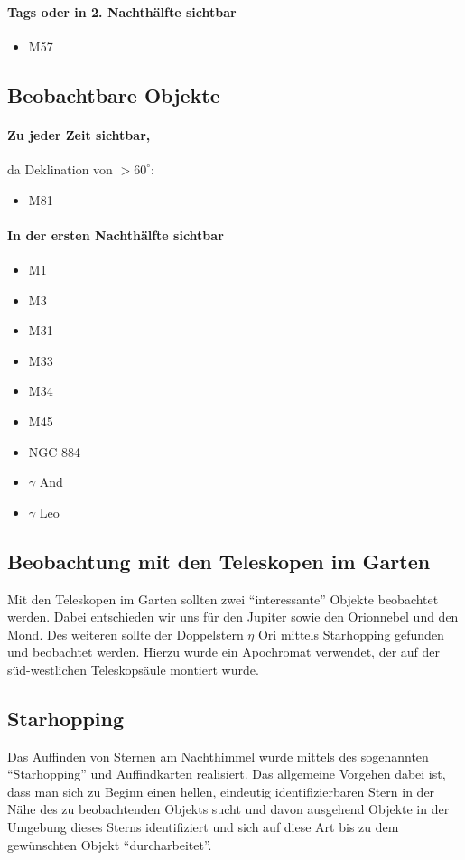 \paragraph{Tags oder in 2. Nachthälfte sichtbar}
\begin{itemize}
\item M57
\end{itemize}
\subsection{Beobachtbare Objekte}
\paragraph{Zu jeder Zeit sichtbar,} da Deklination von $>60^\circ$:
\begin{itemize}
\item M81
\end{itemize}
\paragraph{In der ersten Nachthälfte sichtbar}
\begin{itemize}
\item M1
\item M3
\item M31
\item M33
\item M34
\item M45
\item NGC 884
\item $\gamma$ And
\item $\gamma$ Leo
\end{itemize}

\subsection{Beobachtung mit den Teleskopen im Garten}
Mit den Teleskopen im Garten sollten zwei \enquote{interessante} Objekte beobachtet werden. Dabei entschieden wir uns für den Jupiter sowie den Orionnebel und den Mond. Des weiteren sollte der Doppelstern $\eta$ Ori mittels Starhopping gefunden und beobachtet werden. Hierzu wurde ein Apochromat verwendet, der auf der süd-westlichen Teleskopsäule montiert wurde.
\subsection{Starhopping}
Das Auffinden von Sternen am Nachthimmel wurde mittels des sogenannten \enquote{Starhopping} und Auffindkarten realisiert. Das allgemeine Vorgehen dabei ist, dass man sich zu Beginn einen hellen, eindeutig identifizierbaren Stern in der Nähe des zu beobachtenden Objekts sucht und davon ausgehend Objekte in der Umgebung dieses Sterns identifiziert und sich auf diese Art bis zu dem gewünschten Objekt \enquote{durcharbeitet}.  

